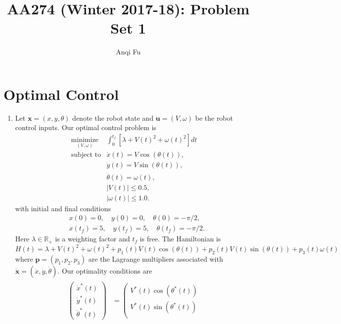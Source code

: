 \documentclass[12pt]{article}
\title{\Large{AA274 (Winter 2017-18): Problem Set 1}}
\author{Anqi Fu}
\begin{document}
\maketitle

\section{Optimal Control}
\begin{enumerate}
	\item Let $\mathbf{x} = (x,y,\theta)$ denote the robot state and $\mathbf{u} = (V,\omega)$ be the robot control inputs. Our optimal control problem is
	\begin{equation}\label{eqn:1_1_opt}
		\begin{array}{cc}
		\underset{(V,\omega)}{\mbox{minimize}} & \int_0^{t_f} [\lambda + V(t)^2 + \omega(t)^2]dt \\
		\mbox{subject to} & \dot x(t) = V\cos(\theta(t)), \\
		& \dot y(t) = V\sin(\theta(t)), \\
		& \dot \theta(t) = \omega(t), \\
		& |V(t)| \leq 0.5, \\
		& |\omega(t)| \leq 1.0.
		\end{array}
	\end{equation}
	with initial and final conditions
	\begin{align*}
		&x(0) = 0, \quad y(0) = 0, \quad \theta(0) = -\pi/2, \\
		&x(t_f) = 5, \quad y(t_f) = 5, \quad \theta(t_f) = -\pi/2.
	\end{align*}
	Here $\lambda \in \mathbb{R}_+$ is a weighting factor and $t_f$ is free. The Hamiltonian is
	\[
		H(t) = \lambda + V(t)^2 + \omega(t)^2 + p_1(t)V(t)\cos(\theta(t)) + p_2(t)V(t)\sin(\theta(t)) + p_3(t)\omega(t)
	\]
	where $\mathbf{p} = (p_1,p_2,p_3)$ are the Lagrange multipliers associated with $\dot{\mathbf{x}} = (\dot x, \dot y, \dot \theta)$. Our optimality conditions are
	\begin{align}\label{eqn:1_1_cond}
	\begin{split}
		\left(\begin{array}{c}
		\dot x^*(t) \\
		\dot y^*(t) \\
		\dot \theta^*(t)
		\end{array}\right) &=
		\left(\begin{array}{c}
		V^*(t)\cos(\theta^*(t)) \\
		V^*(t)\sin(\theta^*(t)) \\

\end{array}
\end{split}
\end{align}
\end{enumerate}
\end{document}
